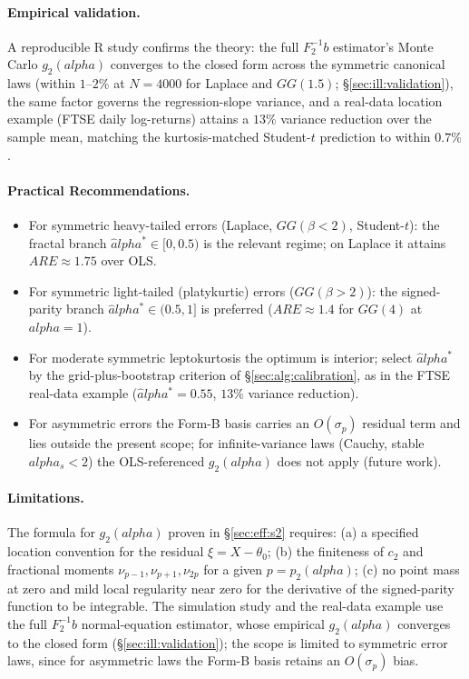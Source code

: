 \documentclass[11pt]{article}
\def\alpha{alpha}%
\def\vec#1{#1}%
\def\mathbf#1{#1}%
\def\mathrm#1{#1}%
\theoremstyle{definition}
\providecommand{\proglang}[1]{\textsf{#1}}
\begin{document}
\paragraph{Empirical validation.}
A reproducible \proglang{R} study confirms the theory: the full
$\mathbf{F}_2^{-1}\vec b$ estimator's Monte Carlo $g_2(\alpha)$ converges to the
closed form across the symmetric canonical laws (within $1$--$2\%$ at $N=4000$
for Laplace and $\mathrm{GG}(1.5)$; \S\ref{sec:ill:validation}), the same factor
governs the regression-slope variance, and a real-data location example (FTSE
daily log-returns) attains a $13\%$ variance reduction over the sample mean,
matching the kurtosis-matched Student-$t$ prediction to within $0.7\%$.

\paragraph{Practical Recommendations.}
\begin{itemize}
  \item For symmetric heavy-tailed errors (Laplace, $\mathrm{GG}(\beta<2)$,
        Student-$t$): the fractal branch $\hat\alpha^{*} \in [0, 0.5)$ is the
        relevant regime; on Laplace it attains $\mathrm{ARE}\approx1.75$ over OLS.
  \item For symmetric light-tailed (platykurtic) errors ($\mathrm{GG}(\beta>2)$):
        the signed-parity branch $\hat\alpha^{*} \in (0.5, 1]$ is preferred
        ($\mathrm{ARE}\approx1.4$ for $\mathrm{GG}(4)$ at $\alpha=1$).
  \item For moderate symmetric leptokurtosis the optimum is interior; select
        $\hat\alpha^{*}$ by the grid-plus-bootstrap criterion of
        \S\ref{sec:alg:calibration}, as in the FTSE real-data example
        ($\hat\alpha^{*}=0.55$, $13\%$ variance reduction).
  \item For asymmetric errors the Form-B basis carries an $O(\sigma_p)$ residual
        term and lies outside the present scope; for infinite-variance laws
        (Cauchy, stable $\alpha_s<2$) the OLS-referenced $g_2(\alpha)$ does not
        apply (future work).
\end{itemize}

\paragraph{Limitations.}
The formula for $g_2(\alpha)$ proven in \S\ref{sec:eff:s2} requires:
(a) a specified location convention for the residual $\xi=X-\theta_0$;
(b) the finiteness of $c_2$ and fractional moments
$\nu_{p-1}, \nu_{p+1}, \nu_{2p}$
for a given $p = p_2(\alpha)$;
(c) no point mass at zero and mild local regularity near zero for
the derivative of the signed-parity function to be integrable.
The simulation study and the real-data example use the full
$\mathbf{F}_2^{-1}\vec b$ normal-equation estimator, whose empirical $g_2(\alpha)$
converges to the closed form (\S\ref{sec:ill:validation}); the scope is limited
to symmetric error laws, since for asymmetric laws the Form-B basis retains an
$O(\sigma_p)$ bias.
\end{document}
